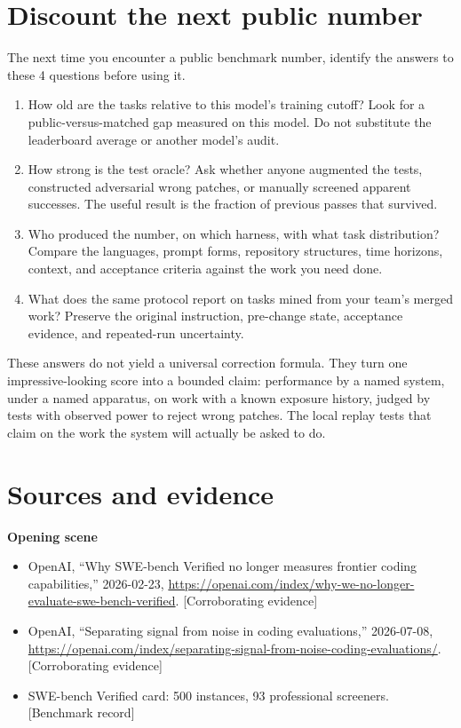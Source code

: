 \hypertarget{discount-the-next-public-number}{%
\section{Discount the next public number}\label{discount-the-next-public-number}}

The next time you encounter a public benchmark number, identify the answers to these 4 questions before using it.

\begin{enumerate}
\def\labelenumi{\arabic{enumi}.}
\tightlist
\item
  How old are the tasks relative to this model's training cutoff? Look for a public-versus-matched gap measured on this model. Do not substitute the leaderboard average or another model's audit.
\item
  How strong is the test oracle? Ask whether anyone augmented the tests, constructed adversarial wrong patches, or manually screened apparent successes. The useful result is the fraction of previous passes that survived.
\item
  Who produced the number, on which harness, with what task distribution? Compare the languages, prompt forms, repository structures, time horizons, context, and acceptance criteria against the work you need done.
\item
  What does the same protocol report on tasks mined from your team's merged work? Preserve the original instruction, pre-change state, acceptance evidence, and repeated-run uncertainty.
\end{enumerate}

These answers do not yield a universal correction formula. They turn one impressive-looking score into a bounded claim: performance by a named system, under a named apparatus, on work with a known exposure history, judged by tests with observed power to reject wrong patches. The local replay tests that claim on the work the system will actually be asked to do.

\section*{Sources and evidence}

\textbf{Opening scene}

\begin{itemize}
\tightlist
\item
  OpenAI, ``Why SWE-bench Verified no longer measures frontier coding capabilities,'' 2026-02-23, \url{https://openai.com/index/why-we-no-longer-evaluate-swe-bench-verified}. {[}Corroborating evidence{]}
\item
  OpenAI, ``Separating signal from noise in coding evaluations,'' 2026-07-08, \url{https://openai.com/index/separating-signal-from-noise-coding-evaluations/}. {[}Corroborating evidence{]}
\item
  SWE-bench Verified card: 500 instances, 93 professional screeners. {[}Benchmark record{]}
\end{itemize}


